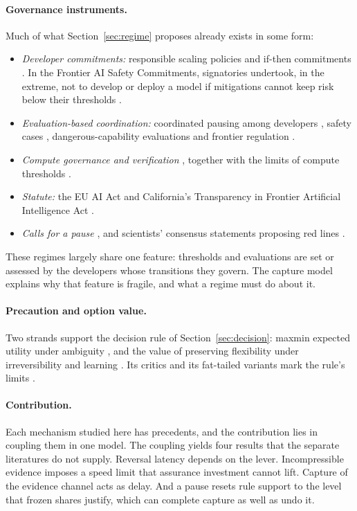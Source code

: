 \documentclass[11pt]{article}
\theoremstyle{plain}
\theoremstyle{definition}
\begin{document}
\paragraph{Governance instruments.} Much of what Section~\ref{sec:regime} proposes already exists in some form:
\begin{itemize}[leftmargin=*]
\item \emph{Developer commitments:} responsible scaling policies and if-then commitments \citep{anthropic2023,karnofsky2024}. In the Frontier AI Safety Commitments, signatories undertook, in the extreme, not to develop or deploy a model if mitigations cannot keep risk below their thresholds \citep{seoul2024}.
\item \emph{Evaluation-based coordination:} coordinated pausing among developers \citep{alaga2023}, safety cases \citep{clymer2024,buhl2024}, dangerous-capability evaluations \citep{shevlane2023} and frontier regulation \citep{anderljung2023}.
\item \emph{Compute governance and verification} \citep{shavit2023,sastry2024,wasil2024,baker2025}, together with the limits of compute thresholds \citep{hooker2024}.
\item \emph{Statute:} the EU AI Act and California's Transparency in Frontier Artificial Intelligence Act \citep{euaiact2024,sb53}.
\item \emph{Calls for a pause} \citep{fli2023}, and scientists' consensus statements proposing red lines \citep{idais2024}.
\end{itemize}
These regimes largely share one feature: thresholds and evaluations are set or assessed by the developers whose transitions they govern. The capture model explains why that feature is fragile, and what a regime must do about it.

\paragraph{Precaution and option value.} Two strands support the decision rule of Section~\ref{sec:decision}: maxmin expected utility under ambiguity \citep{gilboa1989}, and the value of preserving flexibility under irreversibility and learning \citep{arrowfisher1974,henry1974,dixitpindyck1994,gollier2000}. Its critics and its fat-tailed variants mark the rule's limits \citep{sunstein2005,weitzman2009,taleb2014}.

\paragraph{Contribution.} Each mechanism studied here has precedents, and the contribution lies in coupling them in one model. The coupling yields four results that the separate literatures do not supply. Reversal latency depends on the lever. Incompressible evidence imposes a speed limit that assurance investment cannot lift. Capture of the evidence channel acts as delay. And a pause resets rule support to the level that frozen shares justify, which can complete capture as well as undo it.
\end{document}
